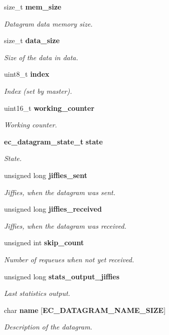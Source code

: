 \begin{DoxyCompactItemize}
size\-\_\-t {\bf mem\-\_\-size}
\begin{DoxyCompactList}\small\item\em Datagram {\itshape data} memory size. \end{DoxyCompactList}\item 
size\-\_\-t {\bf data\-\_\-size}
\begin{DoxyCompactList}\small\item\em Size of the data in {\itshape data}. \end{DoxyCompactList}\item 
uint8\-\_\-t {\bf index}
\begin{DoxyCompactList}\small\item\em Index (set by master). \end{DoxyCompactList}\item 
uint16\-\_\-t {\bf working\-\_\-counter}
\begin{DoxyCompactList}\small\item\em Working counter. \end{DoxyCompactList}\item 
{\bf ec\-\_\-datagram\-\_\-state\-\_\-t} {\bf state}
\begin{DoxyCompactList}\small\item\em State. \end{DoxyCompactList}\item 
unsigned long {\bf jiffies\-\_\-sent}
\begin{DoxyCompactList}\small\item\em Jiffies, when the datagram was sent. \end{DoxyCompactList}\item 
unsigned long {\bf jiffies\-\_\-received}
\begin{DoxyCompactList}\small\item\em Jiffies, when the datagram was received. \end{DoxyCompactList}\item 
unsigned int {\bf skip\-\_\-count}
\begin{DoxyCompactList}\small\item\em Number of requeues when not yet received. \end{DoxyCompactList}\item 
unsigned long {\bf stats\-\_\-output\-\_\-jiffies}
\begin{DoxyCompactList}\small\item\em Last statistics output. \end{DoxyCompactList}\item 
char {\bf name} [{\bf E\-C\-\_\-\-D\-A\-T\-A\-G\-R\-A\-M\-\_\-\-N\-A\-M\-E\-\_\-\-S\-I\-Z\-E}]
\begin{DoxyCompactList}\small\item\em Description of the datagram. \end{DoxyCompactList}\end{DoxyCompactItemize}



